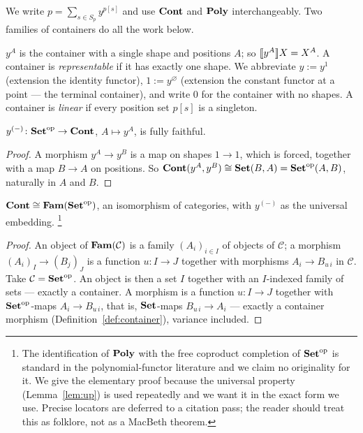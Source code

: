 We write $p=\sum_{s\in S_p} y^{p[s]}$ and use $\mathbf{Cont}$ and $\mathbf{Poly}$
interchangeably. Two families of containers do all the work below.

\begin{Definition}\label{def:repr}
$y^A$ is the container with a single shape and positions $A$; so
$\llbracket y^A \rrbracket X = X^A$. A container is \emph{representable} if it has exactly one
shape. We abbreviate $y:=y^1$ (extension the identity functor), $1:=y^{\varnothing}$
(extension the constant functor at a point --- the terminal container), and write
$0$ for the container with no shapes. A container is \emph{linear} if every
position set $p[s]$ is a singleton.
\end{Definition}

\begin{Lemma}\label{lem:yff}
$y^{(-)}\colon\mathbf{Set}^{\mathrm{op}}\to\mathbf{Cont}$, $A\mapsto y^A$, is fully faithful.
\end{Lemma}

\begin{proof}
A morphism $y^A\to y^B$ is a map on shapes $1\to 1$, which is forced, together
with a map $B\to A$ on positions. So $\mathbf{Cont}(y^A,y^B)\cong\mathbf{Set}(B,A)=
\mathbf{Set}^{\mathrm{op}}(A,B)$, naturally in $A$ and $B$.
\end{proof}

\begin{Lemma}
\label{lem:fam}
$\mathbf{Cont}\cong\mathbf{Fam}(\mathbf{Set}^{\mathrm{op}})$, an isomorphism of categories, with
$y^{(-)}$ as the universal embedding.
%
\footnote{The identification of $\mathbf{Poly}$ with the free coproduct completion of
$\mathbf{Set}^{\mathrm{op}}$ is standard in the polynomial-functor literature and we
claim no originality for it. We give the elementary proof because the universal
property (Lemma~\ref{lem:up}) is used repeatedly and we want it in the exact
form we use. Precise locators are deferred to a citation pass; the reader should
treat this as folklore, not as a MacBeth theorem.}
\end{Lemma}

\begin{proof}
An object of $\mathbf{Fam}(\mathcal C)$ is a family $(A_i)_{i\in I}$ of objects of
$\mathcal C$; a morphism $(A_i)_I\to(B_j)_J$ is a function $u\colon I\to J$
together with morphisms $A_i\to B_{u\,i}$ in $\mathcal C$. Take
$\mathcal C=\mathbf{Set}^{\mathrm{op}}$. An object is then a set $I$ together with an
$I$-indexed family of sets --- exactly a container. A morphism is a function
$u\colon I\to J$ together with $\mathbf{Set}^{\mathrm{op}}$-maps $A_i\to B_{u\,i}$, that
is, $\mathbf{Set}$-maps $B_{u\,i}\to A_i$ --- exactly a container morphism
(Definition~\ref{def:container}), variance included.
\end{proof}


